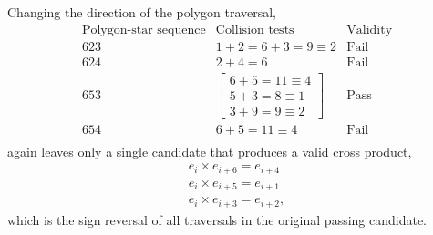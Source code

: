 \documentclass[11pt]{article}
\newcommand{\bv}[1][]{e_{#1}}
\begin{document}
Changing the direction of the polygon traversal,
\begin{equation}
\begin{array}{c|c|c}
\text{Polygon-star sequence} & \text{Collision tests} & \text{Validity} \\\hline \hline
6 2 3 & 1+2 = 6+3=9\equiv2 & \text{Fail} \\%
6 2 4 & 2+4=6 & \text{Fail}\\
6 5 3 &  \begin{bmatrix} 6+5=11\equiv4 \\ 5+3=8\equiv1 \\ 3+9=9\equiv2 \end{bmatrix} &  \text{Pass} \\
6 5 4 &6+5=11\equiv4 & \text{Fail} \\
\end{array}
\end{equation}
 again leaves only a single candidate that produces a valid cross product,
 \begin{subequations}
\begin{align}
\bv[i]\times\bv[i+6] = \bv[i+4] \\
\bv[i]\times\bv[i+5] = \bv[i+1] \\
\bv[i]\times\bv[i+3] = \bv[i+2],
\end{align}
\end{subequations}
 which is the sign reversal of all traversals in the original passing candidate.
\end{document}
